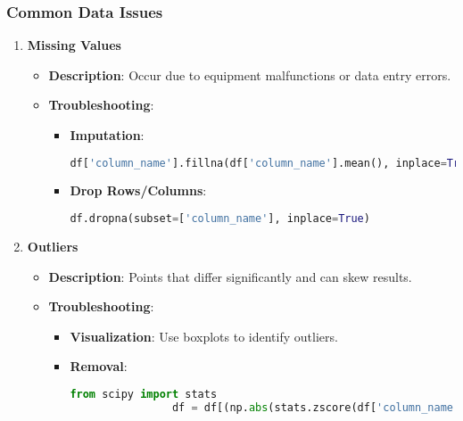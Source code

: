 \documentclass[aspectratio=169]{beamer}
\begin{document}
\begin{frame}[fragile]
    \frametitle{Common Data Issues}
    \begin{enumerate}
        \item \textbf{Missing Values} 
        \begin{itemize}
            \item \textbf{Description}: Occur due to equipment malfunctions or data entry errors.
            \item \textbf{Troubleshooting}:
            \begin{itemize}
                \item \textbf{Imputation}:
                \begin{lstlisting}[language=Python]
                df['column_name'].fillna(df['column_name'].mean(), inplace=True)     
                \end{lstlisting}
                \item \textbf{Drop Rows/Columns}:
                \begin{lstlisting}[language=Python]
                df.dropna(subset=['column_name'], inplace=True)
                \end{lstlisting}
            \end{itemize}
        \end{itemize}

        \item \textbf{Outliers}
        \begin{itemize}
            \item \textbf{Description}: Points that differ significantly and can skew results.
            \item \textbf{Troubleshooting}:
            \begin{itemize}
                \item \textbf{Visualization}: Use boxplots to identify outliers.
                \item \textbf{Removal}:
                \begin{lstlisting}[language=Python]
                from scipy import stats
                df = df[(np.abs(stats.zscore(df['column_name'])) < 3)]
                \end{lstlisting}
            \end{itemize}
        \end{itemize}
    \end{enumerate}
\end{frame}
\end{document}

